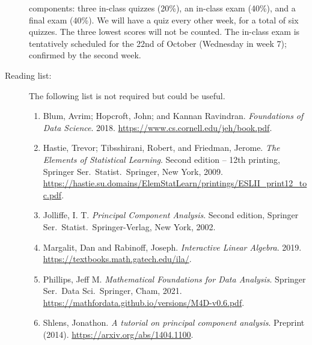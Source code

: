 \documentclass[a4paper, 12pt]{article}
\begin{document}
\begin{description}
    components: three in-class quizzes (20\%), an in-class exam (40\%), and a
    final exam (40\%). We will have a quiz every other week, for a total of six
    quizzes. The three lowest scores will not be counted. The in-class exam is
    tentatively scheduled for the 22nd of October (Wednesday in week 7);
    confirmed by the second week.
    \vspace{1cm}
    \item[Reading list:] The following list is not required but could be useful.
    \begin{enumerate} 
      \item Blum, Avrim; Hopcroft, John; and Kannan Ravindran.
      \textit{Foundations of Data Science}. 2018.
      \url{https://www.cs.cornell.edu/jeh/book.pdf}.
      \item Hastie, Trevor; Tibsshirani, Robert, and Friedman, Jerome. \textit{The Elements of Statistical Learning}. Second edition -- 12th printing, Springer Ser.\ Statist.\ Springer, New York, 2009. \url{https://hastie.su.domains/ElemStatLearn/printings/ESLII_print12_toc.pdf}.
      \item Jolliffe, I. T. \textit{Principal Component Analysis}. Second
      edition, Springer Ser.\ Statist.\ Springer-Verlag, New York, 2002.
      \item Margalit, Dan and Rabinoff, Joseph. \textit{Interactive Linear
      Algebra}. 2019. \url{https://textbooks.math.gatech.edu/ila/}.
      \item Phillips, Jeff M. \textit{Mathematical Foundations for Data Analysis}. Springer Ser.\ Data Sci.\ Springer, Cham, 2021. \url{https://mathfordata.github.io/versions/M4D-v0.6.pdf}.
      \item Shlens, Jonathon. \textit{A tutorial on principal component
      analysis}. Preprint (2014). \url{https://arxiv.org/abs/1404.1100}.
    \end{enumerate}
\end{description}
\end{document}
